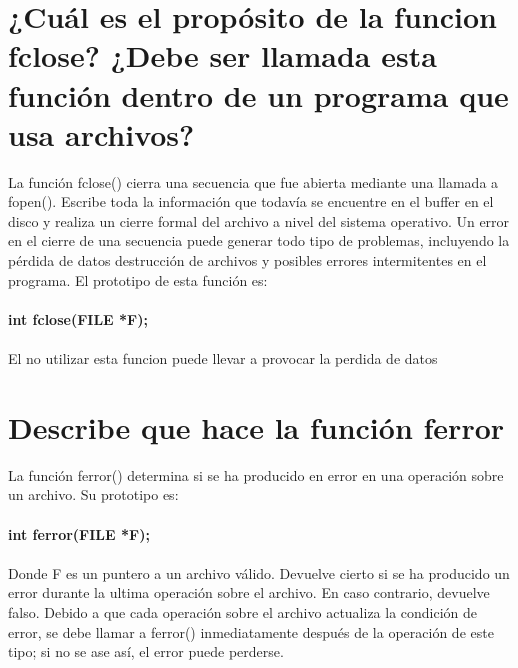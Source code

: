 \documentclass{article}
\begin{document}
\section{¿Cuál es el propósito de la funcion fclose? ¿Debe ser llamada esta función dentro de un programa que usa archivos?}
    La función fclose() cierra una secuencia que fue abierta mediante una llamada a fopen(). Escribe toda la información que todavía se encuentre en el buffer en el disco y realiza un cierre formal del archivo a nivel del sistema operativo. Un error en el cierre de una secuencia puede generar todo tipo de problemas, incluyendo la pérdida de datos destrucción de archivos y posibles errores intermitentes en el programa. El prototipo de esta función es:
    \\\\
    \textbf{int fclose(FILE *F);}
    \\\\
    El no utilizar esta funcion puede llevar a provocar la perdida de datos

\section{Describe que hace la función ferror}
    La función ferror() determina si se ha producido en error en una operación sobre un archivo. Su prototipo es:
    \\\\  
    \textbf{int ferror(FILE *F);}
    \\\\
    Donde F es un puntero a un archivo válido. Devuelve cierto si se ha producido un error durante la ultima operación sobre el archivo. En caso contrario, devuelve falso. Debido a que cada operación sobre el archivo actualiza la condición de error, se debe llamar a ferror() inmediatamente después de la operación de este tipo; si no se ase así, el error puede perderse. 

\end{document}
